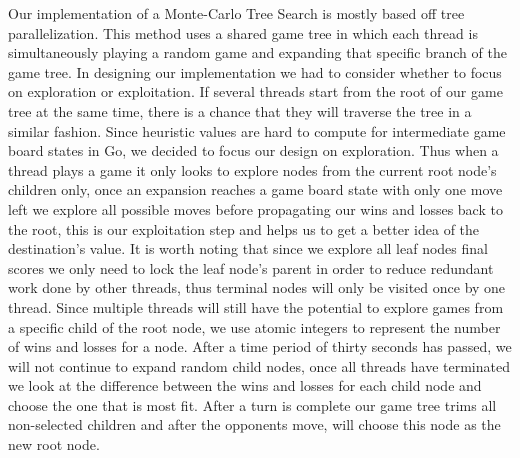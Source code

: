 \documentclass[conference]{IEEEtran}
\begin{document}
Our implementation of a Monte-Carlo Tree Search is mostly based off tree parallelization. This method uses a shared game tree in which each thread is simultaneously playing a random game and expanding that specific branch of the game tree. In designing our implementation we had to consider whether to focus on exploration or exploitation.  If several threads start from the root of our game tree at the same time, there is a chance that they will traverse the tree in a similar fashion. Since heuristic values are hard to compute for intermediate game board states in Go, we decided to focus our design on exploration. Thus when a thread plays a game it only looks to explore nodes from the current root node's children only, once an expansion reaches a game board state with only one move left we explore all possible moves before propagating our wins and losses back to the root, this is our exploitation step and helps us to get a better idea of the destination's value. It is worth noting that since we explore all leaf nodes final scores we only need to lock the leaf node's parent in order to reduce redundant work done by other threads, thus terminal nodes will only be visited once by one thread. Since multiple threads will still have the potential to explore games from a specific child of the root node, we use atomic integers to represent the number of wins and losses for a node. After a time period of thirty seconds has passed, we will not continue to expand random child nodes, once all threads have terminated we look at the difference between the wins and losses for each child node and choose the one that is most fit. After a turn is complete our game tree trims all non-selected children and after the opponents move, will choose this node as the new root node.
\end{document}
